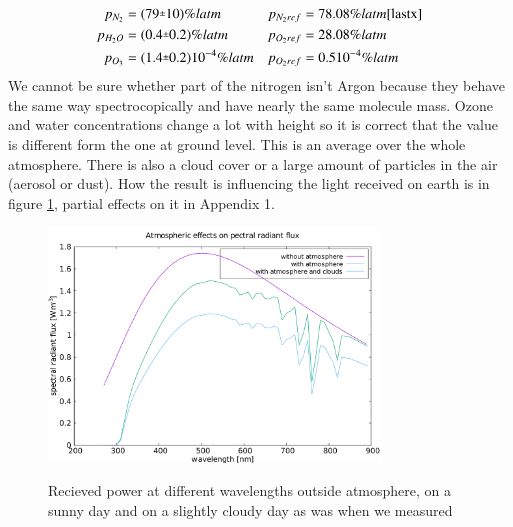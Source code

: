 \documentclass{cfp}
\newcommand{\rpm}{\sbox0{$1$}\sbox2{$\scriptstyle\pm$}
  \raise\dimexpr(\ht0-\ht2)/2\relax\box2 }
\begin{document}
\begin{align}
p_{N_2} &= (79\rpm10) \% latm & p_{N_2ref} &= 78.08 \% latm \cite{lastx}\\
p_{H_2O} &= (0.4\rpm0.2) \% latm & p_{O_2ref} &= 28.08 \% latm\\
p_{O_3} &= (1.4\rpm0.2) 10^{-4} \% latm & p_{O_2ref} &= 0.5 10^{-4} \% latm
\end{align}
We cannot be sure whether part of the nitrogen isn't Argon because they behave the same way spectrocopically and have nearly the same molecule mass. Ozone and water concentrations change a lot with height so it is correct that the value is different form the one at ground level. This is an average over the whole atmosphere. There is also a cloud cover or a large amount of particles in the air (aerosol or dust). How the result is influencing the light received on earth is in figure \ref{spectrocal}, partial effects on it in Appendix 1.
\begin{figure}[!h]
\centering
\caption{Recieved power at different wavelengths outside atmosphere, on a sunny day and on a slightly cloudy day as was when we measured}
\includegraphics[width=250pt]{spectrocal.pdf}
\label{spectrocal}
\end{figure}
\end{document}

